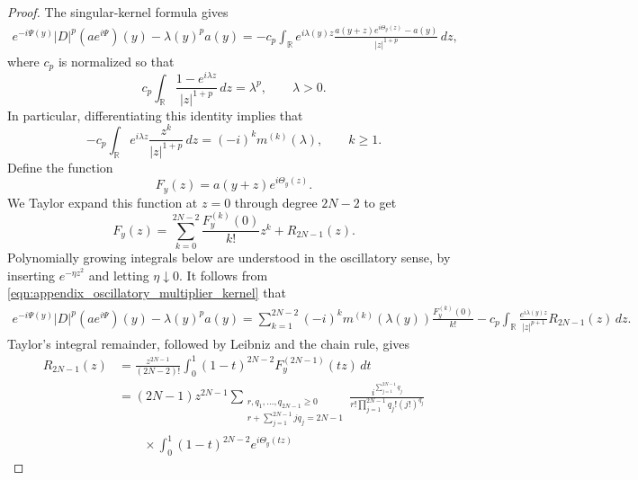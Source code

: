 \documentclass[11pt]{amsart}
\theoremstyle{definition}
\theoremstyle{remark}
\numberwithin{equation}{section}
\begin{document}
\begin{proof}
    The singular-kernel formula gives
    \begin{equation}\label{eqn:appendix_oscillatory_multiplier_kernel}
        \begin{aligned}
            e^{-i\Psi(y)}|D|^p(ae^{i\Psi})(y)-\lambda(y)^pa(y) = -c_p\int_{\mathbb R}e^{i\lambda(y)z}
            \frac{a(y+z)e^{i\Theta_y(z)}-a(y)}{|z|^{1+p}}\,dz,
        \end{aligned}
    \end{equation}
    where $c_p$ is normalized so that
    \[
        c_p\int_{\mathbb R}\frac{1-e^{i\lambda z}}{|z|^{1+p}}\,dz
        =\lambda^p,\qquad \lambda>0.
    \]
    In particular, differentiating this identity implies that
    \begin{equation}\label{eqn:appendix_oscillatory_multiplier_moments}
        -c_p\!\int_{\mathbb R}
        e^{i\lambda z}\frac{z^k}{|z|^{1+p}}\,dz
        =(-i)^km^{(k)}(\lambda),\qquad k\geq1.
    \end{equation}
    Define the function 
    \[F_y(z) = a(y + z)e^{i\Theta_y(z)}.\]
    We Taylor expand this function at $z=0$ through degree $2N-2$ to get
    \[F_y(z) = \sum_{k=0}^{2N-2} \frac{F_y^{(k)}(0)}{k!} z^k + R_{2N-1}(z).\]
    Polynomially growing integrals below are understood in the oscillatory sense, by inserting $e^{-\eta z^2}$ and letting $\eta\downarrow0$.
    It follows from \eqref{eqn:appendix_oscillatory_multiplier_kernel} that
    \begin{align*}
        e^{-i\Psi(y)}|D|^p(ae^{i\Psi})(y)-\lambda(y)^pa(y) = \sum_{k = 1}^{2N-2}(-i)^k m^{(k)}(\lambda(y)) \frac{F_y^{(k)}(0)}{k!}
        - c_p \int_{\mathbb R} \frac{e^{i\lambda(y)z}}{|z|^{p+1}} R_{2N-1}(z) \, dz.
    \end{align*}
    Taylor's integral remainder, followed by Leibniz and the chain rule, gives
    \begin{equation}\label{eqn:appendix_oscillatory_multiplier_taylor_remainder}
        \begin{aligned}
            R_{2N-1}(z)
            &=\frac{z^{2N-1}}{(2N-2)!}\int_0^1(1-t)^{2N-2}F_y^{(2N-1)}(tz)\,dt\\
            &=(2N-1)z^{2N-1}
            \sum_{\substack{r,q_1,\ldots,q_{2N-1}\geq0\\
                r+\sum_{j=1}^{2N-1}jq_j=2N-1}}
            \frac{i^{\sum_{j=1}^{2N-1}q_j}}
            {r!\prod_{j=1}^{2N-1}q_j!(j!)^{q_j}}\\
            &\qquad\times\int_0^1(1-t)^{2N-2}e^{i\Theta_y(tz)}

\end{aligned}
\end{equation}
\end{proof}
\end{document}
